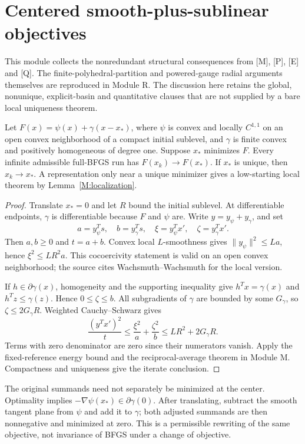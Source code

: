 \section{Centered smooth-plus-sublinear objectives}
This module collects the nonredundant structural consequences from [M], [P], [E] and [Q]. The finite-polyhedral-partition and powered-gauge radial arguments themselves are reproduced in Module R. The discussion here retains the global, nonunique, explicit-basin and quantitative clauses that are not supplied by a bare local uniqueness theorem.

\begin{theorem}\label{F:centered}
Let $F(x)=\psi(x)+\gamma(x-x_*)$, where $\psi$ is convex and locally $C^{1,1}$ on an open convex neighborhood of a compact initial sublevel, and $\gamma$ is finite convex and positively homogeneous of degree one. Suppose $x_*$ minimizes $F$. Every infinite admissible full-BFGS run has $F(x_k)\to F(x_*)$. If $x_*$ is unique, then $x_k\to x_*$. A representation only near a unique minimizer gives a low-starting local theorem by Lemma~\ref{M:localization}.
\end{theorem}
\begin{proof}
Translate $x_*=0$ and let $R$ bound the initial sublevel. At differentiable endpoints, $\gamma$ is differentiable because $F$ and $\psi$ are. Write $y=y_\psi+y_\gamma$, and set
\[
 a=y_\psi^Ts,\quad b=y_\gamma^Ts,\quad
 \xi=y_\psi^Tx',\quad\zeta=y_\gamma^Tx'.
\]
Then $a,b\ge0$ and $t=a+b$. Convex local $L$-smoothness gives $\|y_\psi\|^2\le La$, hence $\xi^2\le LR^2a$. This cocoercivity statement is valid on an open convex neighborhood; the source cites Wachsmuth--Wachsmuth for the local version.

If $h\in\partial\gamma(x)$, homogeneity and the supporting inequality give $h^Tx=\gamma(x)$ and $h^Tz\le\gamma(z)$. Hence $0\le\zeta\le b$. All subgradients of $\gamma$ are bounded by some $G_\gamma$, so $\zeta\le2G_\gamma R$. Weighted Cauchy--Schwarz gives
\[
 \frac{(y^Tx')^2}{t}
 \le\frac{\xi^2}{a}+\frac{\zeta^2}{b}
 \le LR^2+2G_\gamma R.
\]
Terms with zero denominator are zero since their numerators vanish. Apply the fixed-reference energy bound and the reciprocal-average theorem in Module M. Compactness and uniqueness give the iterate conclusion.
\end{proof}
The original summands need not separately be minimized at the center. Optimality implies $-\nabla\psi(x_*)\in\partial\gamma(0)$. After translating, subtract the smooth tangent plane from $\psi$ and add it to $\gamma$; both adjusted summands are then nonnegative and minimized at zero. This is a permissible rewriting of the same objective, not invariance of BFGS under a change of objective.

